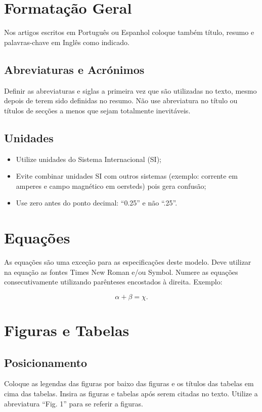 \documentclass[conference]{IEEEtran}
\begin{document}
\section{Formatação Geral}
Nos artigos escritos em Português ou Espanhol coloque também título, resumo e palavras-chave em Inglês como indicado.

\subsection{Abreviaturas e Acrónimos}
Definir as abreviaturas e siglas a primeira vez que são utilizadas no texto, mesmo depois de terem sido definidas no resumo. Não use abreviatura no título ou títulos de secções a menos que sejam totalmente inevitáveis.

\subsection{Unidades}
\begin{itemize}
    \item Utilize unidades do Sistema Internacional (SI);
    \item Evite combinar unidades SI com outros sistemas (exemplo: corrente em amperes e campo magnético em oersteds) pois gera confusão;
    \item Use zero antes do ponto decimal: “0.25” e não “.25”.
\end{itemize}

\section{Equações}
As equações são uma exceção para as especificações deste modelo. Deve utilizar na equação as fontes Times New Roman e/ou Symbol. Numere as equações consecutivamente utilizando parênteses encostados à direita. Exemplo:

\begin{equation}
\alpha + \beta = \chi.
\end{equation}

\section{Figuras e Tabelas}
\subsection{Posicionamento}
Coloque as legendas das figuras por baixo das figuras e os títulos das tabelas em cima das tabelas. Insira as figuras e tabelas após serem citadas no texto. Utilize a abreviatura “Fig. 1” para se referir a figuras.
\end{document}
